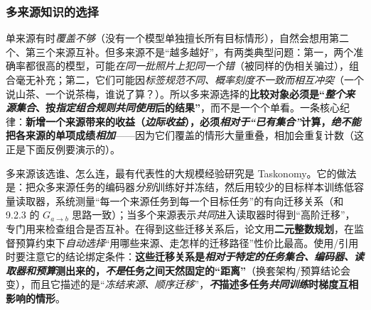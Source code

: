 \subsubsection{多来源知识的选择}
\label{sec:ket-reuse-multiple-sources}

单来源有时\emph{覆盖不够}（没有一个模型单独擅长所有目标情形），自然会想用第二个、第三个来源互补。但多来源不是“越多越好”，有两类典型问题：第一，两个准确率都很高的模型，可能\emph{在同一批照片上犯\emph{同一个}错}（被同样的伪相关骗过），组合毫无补充；第二，它们可能因\emph{标签规范不同、概率刻度不一致而\emph{相互冲突}}（一个说山茶、一个说茶梅，谁说了算？）。所以多来源选择的\textbf{比较对象必须是“\emph{整个来源集合}、按\emph{指定组合规则}\emph{共同使用}后的结果”}，而不是一个个单看。一条核心纪律：\textbf{\textbf{新增一个来源带来的收益（\emph{边际收益}），必须\emph{相对于“\emph{已有}集合”}计算}，\emph{绝不能}把各来源的单项成绩\emph{相加}}——因为它们覆盖的情形大量重叠，相加会重复计数（这正是下面反例要演示的）。

多来源该选谁、怎么连，最有代表性的大规模经验研究是 Taskonomy。它的做法是：把众多来源任务的编码器\emph{分别}训练好并冻结，然后用较少的目标样本训练低容量读取器，系统测量“每一个来源任务到每一个目标任务”的有向迁移关系（和 9.2.3 的 $G_{a\to b}$ 思路一致）；当多个来源表示\emph{共同}进入读取器时得到“高阶迁移”，专门用来检查组合是否互补。在得到这些迁移关系后，论文用\textbf{二元整数规划}，在监督预算约束下\emph{自动选择}“用哪些来源、走怎样的迁移路径”性价比最高。使用/引用时要注意它的结论绑定条件：\textbf{这些迁移关系是\emph{相对于特定的任务集合、编码器、读取器和预算}测出来的，\emph{不是}任务之间天然固定的“距离”}（换套架构/预算结论会变），而且它描述的是“\emph{冻结来源、顺序迁移}”，\textbf{\emph{不}描述多任务\emph{共同训练}时梯度互相影响的情形}。

